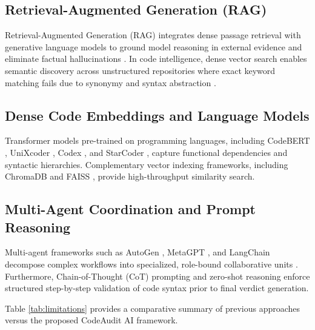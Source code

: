 \documentclass[conference]{IEEEtran}
\begin{document}
\subsection{Retrieval-Augmented Generation (RAG)}
Retrieval-Augmented Generation (RAG) integrates dense passage retrieval with generative language models to ground model reasoning in external evidence and eliminate factual hallucinations \cite{lewis2020rag, izacard2021fid}. In code intelligence, dense vector search enables semantic discovery across unstructured repositories where exact keyword matching fails due to synonymy and syntax abstraction \cite{reimers2019sentencebert, su2022instructor}.

\subsection{Dense Code Embeddings and Language Models}
Transformer models pre-trained on programming languages, including CodeBERT \cite{feng2020codebert}, UniXcoder \cite{guo2022unixcoder}, Codex \cite{chen2021codex}, and StarCoder \cite{li2023starcoder}, capture functional dependencies and syntactic hierarchies. Complementary vector indexing frameworks, including ChromaDB \cite{chromadb2023} and FAISS \cite{johnson2021faiss}, provide high-throughput similarity search.

\subsection{Multi-Agent Coordination and Prompt Reasoning}
Multi-agent frameworks such as AutoGen \cite{wu2023autogen}, MetaGPT \cite{hong2023metagpt}, and LangChain \cite{langchain2023} decompose complex workflows into specialized, role-bound collaborative units \cite{park2023generativeagents}. Furthermore, Chain-of-Thought (CoT) prompting \cite{wei2022chainofthought} and zero-shot reasoning \cite{kojima2022zeroshotcot} enforce structured step-by-step validation of code syntax prior to final verdict generation.

Table \ref{tab:limitations} provides a comparative summary of previous approaches versus the proposed CodeAudit AI framework.
\end{document}
